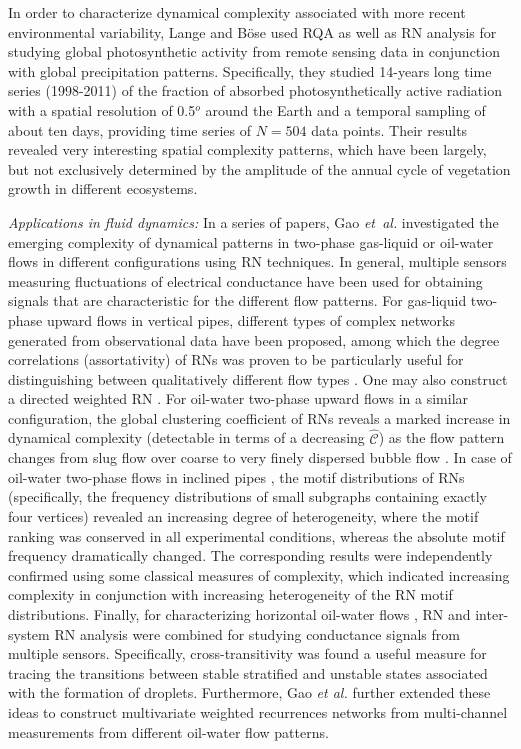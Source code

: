 		In order to characterize dynamical complexity associated with more recent environmental variability, Lange and B\"ose \cite{Boese2012,Lange2013Book} used RQA as well as RN analysis for studying global photosynthetic activity from remote sensing data in conjunction with global precipitation patterns. Specifically, they studied 14-years long time series (1998-2011) of the fraction of absorbed photosynthetically active radiation with a spatial resolution of 0.5$^o$ around the Earth and a temporal sampling of about ten days, providing time series of $N=504$ data points. Their results revealed very interesting spatial complexity patterns, which have been largely, but not exclusively determined by the amplitude of the annual cycle of vegetation growth in different ecosystems.


		\emph{Applications in fluid dynamics: }
		In a series of papers, Gao \textit{et~al.} investigated the emerging complexity of dynamical patterns in two-phase gas-liquid or oil-water flows in different configurations using RN techniques. In general, multiple sensors measuring fluctuations of electrical conductance have been used for obtaining signals that are characteristic for the different flow patterns. For gas-liquid two-phase upward flows in vertical pipes, different types of complex networks generated from observational data have been proposed, among which the degree correlations (assortativity) of RNs was proven to be particularly useful for distinguishing between qualitatively different flow types \cite{Gao2009,Gao2009a,Gao2010a}. One may also construct a directed weighted RN \cite{Gao2012,Gao2012a,Gao2013b,Gao2013d,Zhang2013b}. For oil-water two-phase upward flows in a similar configuration, the global clustering coefficient of RNs reveals a marked increase in dynamical complexity (detectable in terms of a decreasing $\hat{\mathcal{C}}$) as the flow pattern changes from slug flow over coarse to very finely dispersed bubble flow \cite{Gao2013,Gao2013c}. In case of oil-water two-phase flows in inclined pipes \cite{Gao2010}, the motif distributions of RNs (specifically, the frequency distributions of small subgraphs containing exactly four vertices) revealed an increasing degree of heterogeneity, where the motif ranking was conserved in all experimental conditions, whereas the absolute motif frequency dramatically changed. The corresponding results were independently confirmed using some classical measures of complexity, which indicated increasing complexity in conjunction with increasing heterogeneity of the RN motif distributions. Finally, for characterizing horizontal oil-water flows \cite{Gao2013d}, RN and inter-system RN analysis were combined for studying conductance signals from multiple sensors. Specifically, cross-transitivity was found a useful measure for tracing the transitions between stable stratified and unstable states associated with the formation of droplets. Furthermore, Gao {\textit{et al.}} \cite{Gao2015a,Gao2016,Gao2016b,Gao2016c} further extended these ideas to construct multivariate weighted recurrences networks from multi-channel measurements from different oil-water flow patterns. 
		

